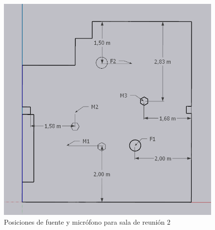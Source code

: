 \begin{figure}[H]
    \centering
    \includegraphics[scale=0.4]{Imagenes/PosicionesRT/Posiciones Sala 2.png}
    \caption{Posiciones de fuente y micrófono para sala de reunión 2}
    \label{fig: posiciones sala2}
\end{figure}

